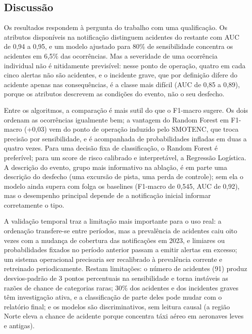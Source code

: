 \documentclass[12pt]{article}
\begin{document}
\subsection{Discussão}
\label{sec:discussao}

Os resultados respondem à pergunta do trabalho com uma qualificação. Os atributos disponíveis na notificação distinguem acidentes do restante com AUC de 0,94 a 0,95, e um modelo ajustado para 80\% de sensibilidade concentra os acidentes em 6,5\% das ocorrências. Mas a severidade de uma ocorrência individual não é nitidamente previsível: nesse ponto de operação, quatro em cada cinco alertas não são acidentes, e o incidente grave, que por definição difere do acidente apenas nas consequências, é a classe mais difícil (AUC de 0,85 a 0,89), porque os atributos descrevem as condições do evento, não o seu desfecho.

Entre os algoritmos, a comparação é mais sutil do que o F1-macro sugere. Os dois ordenam as ocorrências igualmente bem; a vantagem do Random Forest em F1-macro (+0,03) vem do ponto de operação induzido pelo SMOTENC, que troca precisão por sensibilidade, e é acompanhada de probabilidades infladas em duas a quatro vezes. Para uma decisão fixa de classificação, o Random Forest é preferível; para um score de risco calibrado e interpretável, a Regressão Logística. A descrição do evento, grupo mais informativo na ablação, é em parte uma descrição do desfecho (uma excursão de pista, uma perda de controle); sem ela o modelo ainda supera com folga os baselines (F1-macro de 0,545, AUC de 0,92), mas o desempenho principal depende de a notificação inicial informar corretamente o tipo.

A validação temporal traz a limitação mais importante para o uso real: a ordenação transfere-se entre períodos, mas a prevalência de acidentes caiu oito vezes com a mudança de cobertura das notificações em 2023, e limiares ou probabilidades fixados no período anterior passam a emitir alertas em excesso; um sistema operacional precisaria ser recalibrado à prevalência corrente e retreinado periodicamente. Restam limitações: o número de acidentes (91) produz desvios-padrão de 3 pontos percentuais na sensibilidade e torna instáveis as razões de chance de categorias raras; 30\% dos acidentes e dos incidentes graves têm investigação ativa, e a classificação de parte deles pode mudar com o relatório final; e os modelos são discriminativos, sem leitura causal (a região Norte eleva a chance de acidente porque concentra táxi aéreo em aeronaves leves e antigas).
\end{document}
